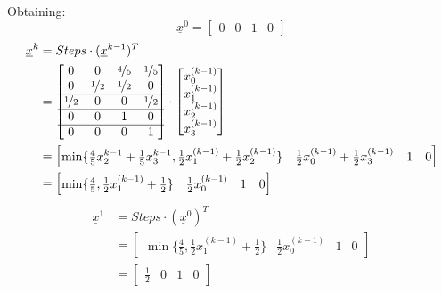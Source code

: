 Obtaining:
\[
	\underline{x}^0 = \begin{bmatrix} 0 & 0 & 1 & 0 \end{bmatrix}
\]
\begin{align*}
	\underline{x}^k & = Steps \cdot (\underline{x}^{k-1})^T                                                             \\
	                & = \begin{bmatrix}
		                    0               & 0               & \nicefrac{4}{5} & \nicefrac{1}{5} \\
		                    0               & \nicefrac{1}{2} & \nicefrac{1}{2} & 0               \\
		                    \hline
		                    \nicefrac{1}{2} & 0               & 0               & \nicefrac{1}{2} \\
		                    \hline
		                    0               & 0               & 1               & 0               \\
		                    \hline
		                    0               & 0               & 0               & 1
	                    \end{bmatrix} \cdot
	\begin{bmatrix}
		x_0^{(k-1)} \\
		x_1^{(k-1)} \\
		x_2^{(k-1)} \\
		x_3^{(k-1)}
	\end{bmatrix}                                                                                                      \\
	                & = \begin{bmatrix}
		                    \min \{ \frac{4}{5}x_2^{k-1}+\frac{1}{5}x_3^{k-1},
		                    \frac{1}{2} x_1^{(k-1)} + \frac{1}{2} x_2^{(k-1)} \} &
		                    \frac{1}{2} x_0^{(k-1)} + \frac{1}{2} x_3^{(k-1)}    & 1 & 0
	                    \end{bmatrix}                                    \\
	                & = \begin{bmatrix}
		                    \min \{ \frac{4}{5}, \frac{1}{2} x_1^{(k-1)} + \frac{1}{2} \} & \frac{1}{2} x_0^{(k-1)} & 1 & 0
	                    \end{bmatrix} \\
\end{align*}
\begin{align*}
	\underline{x}^1 & = Steps \cdot (\underline{x}^{0})^T                                                               \\
	                & = \begin{bmatrix}
		                    \min \{ \frac{4}{5}, \frac{1}{2} x_1^{(k-1)} + \frac{1}{2} \} & \frac{1}{2} x_0^{(k-1)} & 1 & 0
	                    \end{bmatrix} \\
	                & = \begin{bmatrix}
		                    \frac{1}{2} & 0 & 1 & 0
	                    \end{bmatrix}
\end{align*}
